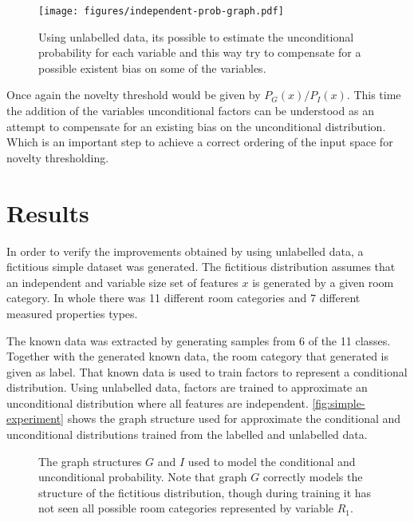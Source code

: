 \documentclass[runningheads,a4paper]{llncs}
\begin{document}
\begin{figure}[h]
\centering
\texttt{[image: figures/independent-prob-graph.pdf]}
\caption{\label{fig:semisupervised-threshold}Using unlabelled data, its possible to estimate
         the unconditional probability for each variable and this way try to compensate
         for a possible existent bias on some of the variables.}
\end{figure}

Once again the novelty threshold would be given by $P_G(x)/P_I(x)$.
This time the addition of the variables unconditional factors can be understood as an
attempt to compensate for an existing bias on the unconditional distribution.
Which is an important step to achieve a correct ordering of the input space for novelty
thresholding.


\section{Results}
In order to verify the improvements obtained by using unlabelled data, a fictitious simple
dataset was generated.
The fictitious distribution assumes that an independent and variable size set of features
$x$ is generated by a given room category.
In whole there was 11 different room categories and 7 different measured properties types.

The known data was extracted by generating samples from 6 of the 11 classes.
Together with the generated known data, the room category that generated is given as label.
That known data is used to train factors to represent a conditional distribution.
Using unlabelled data, factors are trained to approximate an unconditional distribution
where all features are independent.
\autoref{fig:simple-experiment} shows the graph structure used for approximate the conditional and
unconditional distributions trained from the labelled and unlabelled data.

\begin{figure}[h]
\centering

\qquad
{}

\caption{\label{fig:simple-experiment}The graph structures $G$ and $I$ used to model the
         conditional and unconditional probability.
         Note that graph $G$ correctly models the structure of the fictitious distribution, though
         during training it has not seen all possible room categories represented by variable $R_1$.}

\end{figure}
\end{document}
